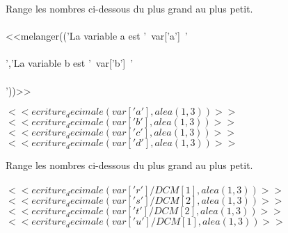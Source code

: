 Range les nombres ci-dessous du plus grand au plus petit.\\ \\




<<melanger(('La variable a est '~var['a']~'\\\\','La variable b est '~var['b']~'\\\\'))>>

  


$<<ecriture_decimale(var['a'],alea(1,3))>>$ \hfill $<<ecriture_decimale(var['b'],alea(1,3))>>$ \hfill $<<ecriture_decimale(var['c'],alea(1,3))>>$ \hfill $<<ecriture_decimale(var['d'],alea(1,3))>>$



\bigskip
Range les nombres ci-dessous du plus grand au plus petit.\\ \\



$<<ecriture_decimale(var['r']/DCM[1],alea(1,3))>>$ \hfill $<<ecriture_decimale(var['s']/DCM[2],alea(1,3))>>$ \hfill $<<ecriture_decimale(var['t']/DCM[2],alea(1,3))>>$ \hfill $<<ecriture_decimale(var['u']/DCM[1],alea(1,3))>>$

